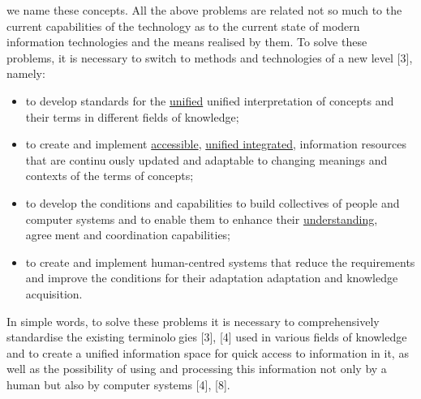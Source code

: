 \documentclass[10pt, a4paper]{article}
\begin{document}
\begin{multicols}{2}
we name these concepts. All the above problems are
related not so much to the current capabilities of the
technology as to the current state of modern information
technologies and the means realised by them. To solve
these problems, it is necessary to switch to methods and
technologies of a new level [3], namely:
\begin{itemize}
    \item  to develop standards for the \underline {unified} unified interpretation
of concepts and their terms in different fields of
knowledge;
    \item to create and implement \underline {accessible}, \underline {unified 
integrated},  information resources that are continuously updated and adaptable to changing meanings
and contexts of the terms of concepts;
    \item to develop the conditions and capabilities to build
collectives of people and computer systems and to
enable them to enhance their  \underline {understanding}, agreement and coordination capabilities; 
    \item  to create and implement human-centred systems that
reduce the requirements and improve the conditions
for their adaptation adaptation and knowledge acquisition.
\end{itemize}
\par
In simple words, to solve these problems it is necessary
to comprehensively standardise the existing terminologies [3], [4] used in various fields of knowledge and to
create a unified information space for quick access to
information in it, as well as the possibility of using and
processing this information not only by a human but also
by computer systems [4], [8].


\end{multicols}
\end{document}
